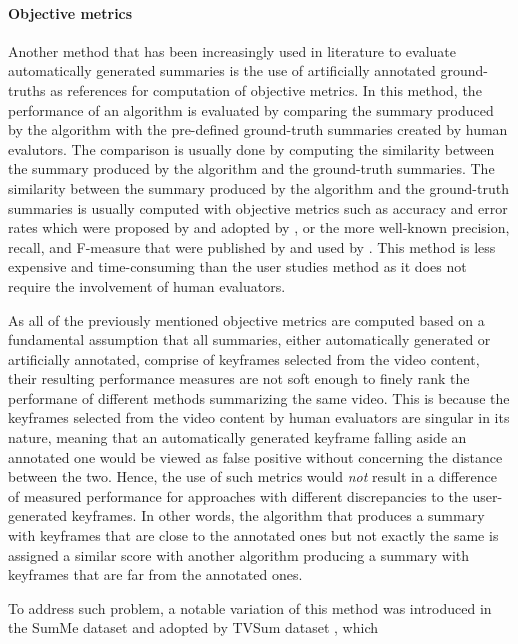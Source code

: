 		\paragraph[short]{Objective metrics}
			Another method that has been increasingly used in literature to evaluate automatically generated summaries is the use of artificially annotated ground-truths as references for computation of objective metrics. In this method, the performance of an algorithm is evaluated by comparing the summary produced by the algorithm with the pre-defined ground-truth summaries created by human evalutors. The comparison is usually done by computing the similarity between the summary produced by the algorithm and the ground-truth summaries. The similarity between the summary produced by the algorithm and the ground-truth summaries is usually computed with objective metrics such as accuracy and error rates which were proposed by \cite{ejaz2012adaptive} and adopted by \cite{almeida2012vison,cahuina2013new,jacob2017video}, or the more well-known precision, recall, and F-measure that were published by \cite{mahmoud2013unsupervised} and used by \cite{gong2014diverse,guan2014top,mei2015video,demir2015video}. This method is less expensive and time-consuming than the user studies method as it does not require the involvement of human evaluators.

			As all of the previously mentioned objective metrics are computed based on a fundamental assumption that all summaries, either automatically generated or artificially annotated, comprise of keyframes selected from the video content, their resulting performance measures are not soft enough to finely rank the performane of different methods summarizing the same video. This is because the keyframes selected from the video content by human evaluators are singular in its nature, meaning that an automatically generated keyframe falling aside an annotated one would be viewed as false positive without concerning the distance between the two. Hence, the use of such metrics would \textit{not} result in a difference of measured performance for approaches with different discrepancies to the user-generated keyframes. In other words, the algorithm that produces a summary with keyframes that are close to the annotated ones but not exactly the same is assigned a similar score with another algorithm producing a summary with keyframes that are far from the annotated ones.
			
			To address such problem, a notable variation of this method was introduced in the SumMe dataset \cite{SumMe} and adopted by TVSum dataset \cite{TVSum}, which 
			
